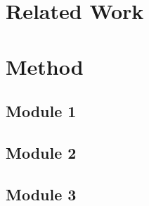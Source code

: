\documentclass{article}
\begin{document}
\section{Related Work}
\label{sec:related}


\section{Method}
\label{sec:method}


\subsection{Module 1}
\label{sec:module1}

\subsection{Module 2}
\label{sec:module2}

\subsection{Module 3}
\label{sec:module3}
\end{document}
